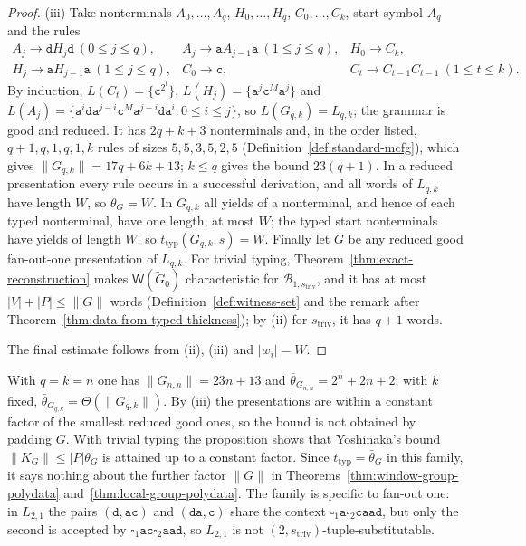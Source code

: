 \documentclass[11pt]{article}
\numberwithin{equation}{section}
\theoremstyle{plain}
\theoremstyle{definition}
\theoremstyle{remark}
\newcommand{\Wit}{\mathsf{W}}
\newcommand{\blank}{\square}
\begin{document}
\begin{proof}
(iii) Take nonterminals $A_0,\ldots,A_q$, $H_0,\ldots,H_q$, $C_0,\ldots,C_k$,
start symbol $A_q$ and the rules
\[
\begin{array}{lll}
 A_j\to\mathtt d H_j\mathtt d\ (0\le j\le q), &
 A_j\to\mathtt a A_{j-1}\mathtt a\ (1\le j\le q), &
 H_0\to C_k,\\
 H_j\to\mathtt a H_{j-1}\mathtt a\ (1\le j\le q), &
 C_0\to\mathtt c, &
 C_t\to C_{t-1}C_{t-1}\ (1\le t\le k).
\end{array}
\]
By induction, $L(C_t)=\{\mathtt c^{2^t}\}$,
$L(H_j)=\{\mathtt a^j\mathtt c^M\mathtt a^j\}$ and
$L(A_j)=\{\mathtt a^i\mathtt d\mathtt a^{j-i}\mathtt c^M\mathtt a^{j-i}
\mathtt d\mathtt a^i:0\le i\le j\}$, so $L(G_{q,k})=L_{q,k}$; the grammar is
good and reduced.  It has $2q+k+3$ nonterminals and, in the order listed,
$q+1,q,1,q,1,k$ rules of sizes $5,5,3,5,2,5$
(Definition~\ref{def:standard-mcfg}), which gives $\|G_{q,k}\|=17q+6k+13$;
$k\le q$ gives the bound $23(q+1)$.  In a reduced presentation every rule
occurs in a successful derivation, and all words of $L_{q,k}$ have length
$W$, so $\bar\theta_G=W$.  In $G_{q,k}$ all yields of a nonterminal, and hence
of each typed nonterminal, have one length, at most $W$; the typed start
nonterminals have yields of length $W$, so $t_{\mathrm{typ}}(G_{q,k},s)=W$.
Finally let $G$ be any reduced good fan-out-one presentation of $L_{q,k}$.
For trivial typing, Theorem~\ref{thm:exact-reconstruction} makes
$\Wit(\widetilde G_0)$ characteristic for $\mathcal B_{1,s_{\mathrm{triv}}}$,
and it has at most $|V|+|P|\le\|G\|$ words
(Definition~\ref{def:witness-set} and the remark after
Theorem~\ref{thm:data-from-typed-thickness}); by (ii) for
$s_{\mathrm{triv}}$, it has $q+1$ words.

The final estimate follows from (ii), (iii) and $|w_i|=W$.
\end{proof}

With $q=k=n$ one has $\|G_{n,n}\|=23n+13$ and $\bar\theta_{G_{n,n}}=2^n+2n+2$;
with $k$ fixed, $\bar\theta_{G_{q,k}}=\Theta(\|G_{q,k}\|)$.  By (iii) the
presentations are within a constant factor of the smallest reduced good ones,
so the bound is not obtained by padding $G$.  With trivial typing the
proposition shows that Yoshinaka's bound $\|K_G\|\le|P|\theta_G$ is attained
up to a constant factor.  Since $t_{\mathrm{typ}}=\bar\theta_G$ in this family,
it says nothing about the further factor $\|G\|$ in
Theorems~\ref{thm:window-group-polydata} and~\ref{thm:local-group-polydata}.
The family is specific to fan-out one: in $L_{2,1}$ the pairs
$(\mathtt d,\mathtt{ac})$ and $(\mathtt{da},\mathtt c)$ share the context
$\blank_1\mathtt a\blank_2\mathtt{caad}$, but only the second is accepted by
$\blank_1\mathtt{ac}\blank_2\mathtt{aad}$, so $L_{2,1}$ is not
$(2,s_{\mathrm{triv}})$-tuple-substitutable.
\end{document}

